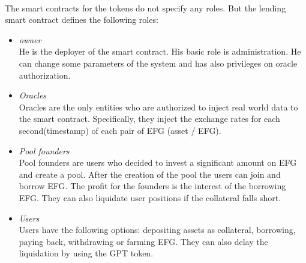 \documentclass{article}
\begin{document}
\paragraph{ }
The smart contracts for the tokens do not specify any roles. But the lending smart contract defines the following roles:
\begin{itemize}
\item \emph{owner} \\
He is the deployer of the smart contract. His basic role is administration. He can change some parameters of the system and has also privileges on oracle authorization.
\item \emph{Oracles} \\
Oracles are the only entities who are authorized to inject real world data to the smart contract. Specifically, they inject the exchange rates for each second(timestamp) of each pair of EFG (asset / EFG).
\item \emph{Pool founders} \\
Pool founders are users who decided to invest a significant amount on EFG and create a pool. After the creation of the pool the users can join and  borrow EFG. The profit for the founders is the interest of the borrowing EFG. They can also liquidate user positions if the collateral falls short.
\item \emph{Users} \\
Users have the following options: depositing assets as collateral, borrowing, paying back, withdrawing or farming EFG. They can also delay the liquidation by using the GPT token.
\end{itemize}
\end{document}
